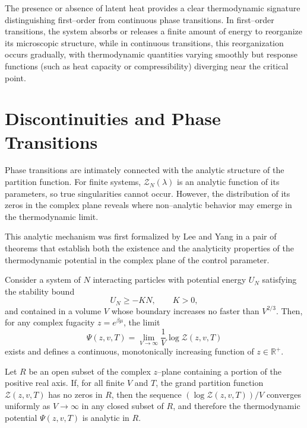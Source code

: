 \begin{remark}
    The presence or absence of latent heat provides a clear thermodynamic signature distinguishing first--order from continuous phase transitions.
    In first--order transitions, the system absorbs or releases a finite amount of energy to reorganize its microscopic structure, while in continuous transitions, this reorganization occurs gradually, with thermodynamic quantities varying smoothly but response functions (such as heat capacity or compressibility) diverging near the critical point.
\end{remark}

\section{Discontinuities and Phase Transitions}

Phase transitions are intimately connected with the analytic structure of the partition function.
For finite systems, \( \mathcal{Z}_N(\lambda) \) is an analytic function of its parameters, so true singularities cannot occur.
However, the distribution of its zeros in the complex plane reveals where non--analytic behavior may emerge in the thermodynamic limit.

This analytic mechanism was first formalized by Lee and Yang in a pair of theorems that establish both the existence and the analyticity properties of the thermodynamic potential in the complex plane of the control parameter.

\begin{theorem}
    Consider a system of \(N\) interacting particles with potential energy \(U_N\) satisfying the stability bound
    \[
        U_N \geq - K N , \qquad K > 0,
    \]
    and contained in a volume \(V\) whose boundary increases no faster than \(V^{2/3}\).
    Then, for any complex fugacity \(z = e^{\beta \mu}\), the limit
    \[
        \Psi(z,v,T) = \lim_{V \to \infty} \frac{1}{V} \log \mathcal{Z}(z,v,T)
    \]
    exists and defines a continuous, monotonically increasing function of \(z \in \mathbb{R}^+\).
\end{theorem}

\begin{theorem}
    Let \(R\) be an open subset of the complex \(z\)--plane containing a portion of the positive real axis.
    If, for all finite \(V\) and \(T\), the grand partition function \( \mathcal{Z}(z,v,T) \) has no zeros in \(R\),
    then the sequence \( (\log \mathcal{Z}(z,v,T))/V \) converges uniformly as \( V \to \infty \) in any closed subset of \(R\),
    and therefore the thermodynamic potential \( \Psi(z,v,T) \) is analytic in \(R\).
\end{theorem}

